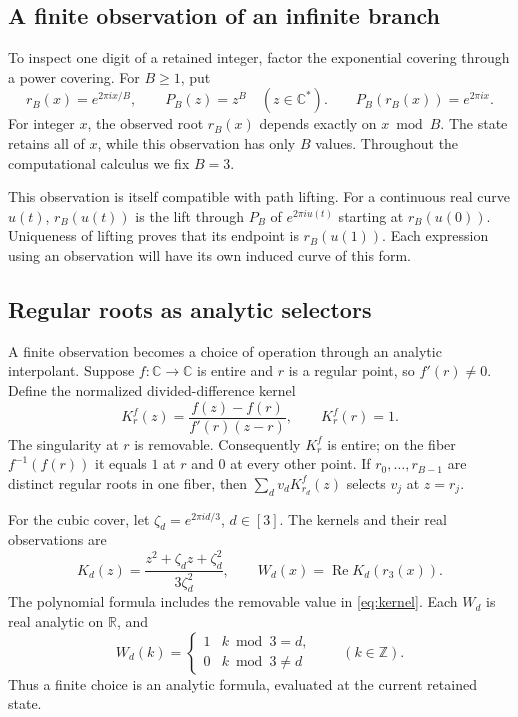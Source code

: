 \documentclass[11pt]{article}
\numberwithin{equation}{section}
\theoremstyle{definition}
\theoremstyle{remark}
\newcommand{\Z}{\mathbb Z}
\newcommand{\R}{\mathbb R}
\newcommand{\C}{\mathbb C}
\DeclareMathOperator{\Rea}{Re}
\begin{document}
\subsection{A finite observation of an infinite branch}

To inspect one digit of a retained integer, factor the exponential
covering through a power covering. For $B\geq1$, put
\begin{equation}\label{eq:root-observation}
 r_B(x)=e^{2\pi i x/B},\qquad P_B(z)=z^B\quad(z\in\C^*).
 \qquad P_B(r_B(x))=e^{2\pi i x}.
\end{equation}
For integer $x$, the observed root $r_B(x)$ depends exactly on $x\bmod B$.
The state retains all of $x$, while this observation has only $B$ values.
Throughout the computational calculus we fix $B=3$.

This observation is itself compatible with path lifting. For a continuous
real curve $u(t)$, $r_B(u(t))$ is the lift through $P_B$ of
$e^{2\pi i u(t)}$ starting at $r_B(u(0))$. Uniqueness of lifting proves
that its endpoint is $r_B(u(1))$. Each expression using an observation
will have its own induced curve of this form.

\subsection{Regular roots as analytic selectors}

A finite observation becomes a choice of operation through an analytic
interpolant. Suppose $f:\C\to\C$ is entire and $r$ is a regular point,
so $f'(r)\ne0$. Define the normalized divided-difference kernel
\begin{equation}\label{eq:kernel}
 K_r^f(z)=\frac{f(z)-f(r)}{f'(r)(z-r)},\qquad K_r^f(r)=1.
\end{equation}
The singularity at $r$ is removable. Consequently $K_r^f$ is entire;
on the fiber $f^{-1}(f(r))$ it equals $1$ at $r$ and $0$ at every other
point. If $r_0,\ldots,r_{B-1}$ are distinct regular roots in one fiber,
then $\sum_d v_d K_{r_d}^f(z)$ selects $v_j$ at $z=r_j$.

For the cubic cover, let $\zeta_d=e^{2\pi i d/3}$, $d\in[3]$.
The kernels and their real observations are
\begin{equation}\label{eq:cubic-weights}
 K_d(z)=\frac{z^2+\zeta_d z+\zeta_d^2}{3\zeta_d^2},
 \qquad W_d(x)=\Rea K_d(r_3(x)).
\end{equation}
The polynomial formula includes the removable value in
\eqref{eq:kernel}. Each $W_d$ is real analytic on $\R$, and
\begin{equation}\label{eq:kronecker}
 W_d(k)=\begin{cases}1&k\bmod3=d,\\0&k\bmod3\ne d\end{cases}
 \qquad(k\in\Z).
\end{equation}
Thus a finite choice is an analytic formula, evaluated at the current
retained state.
\end{document}
